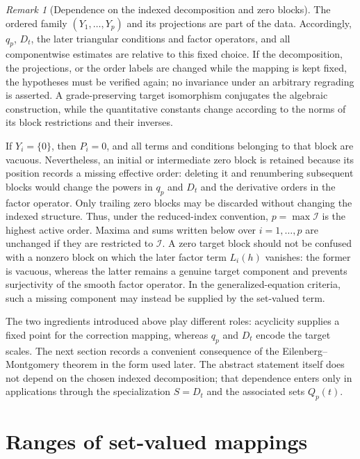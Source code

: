 \documentclass[11pt]{amsart}
\theoremstyle{definition}
\theoremstyle{remark}
\newtheorem{remark}[theorem]{Remark}
\begin{document}
	\begin{remark}[Dependence on the indexed decomposition and zero blocks]
		\label{rem:grading-dependence}
		The ordered family $(Y_1,\ldots,Y_p)$ and its projections are part of the
		data.  Accordingly, $q_p$, $D_t$, the later triangular conditions and
		factor operators, and all componentwise estimates are relative to this
		fixed choice.  If the decomposition, the projections, or the order labels
		are changed while the mapping is kept fixed, the hypotheses must be
		verified again; no invariance under an arbitrary regrading is asserted.
		A grade-preserving target isomorphism conjugates the algebraic construction,
		while the quantitative constants change according to the norms of its block
		restrictions and their inverses.
		
		If $Y_i=\{0\}$, then $P_i=0$, and all terms and conditions belonging to
		that block are vacuous.  Nevertheless, an initial or intermediate zero
		block is retained because its position records a missing effective order:
		deleting it and renumbering subsequent blocks would change the powers in
		$q_p$ and $D_t$ and the derivative orders in the factor operator.  Only
		trailing zero blocks may be discarded without changing the indexed
		structure.  Thus, under the reduced-index convention, $p=\max\mathcal I$
		is the highest active order.  Maxima and sums written below over
		$i=1,\ldots,p$ are unchanged if they are restricted to $\mathcal I$.
		A zero target block should not be confused with a nonzero block on which
		the later factor term $L_i(h)$ vanishes: the former is vacuous, whereas
		the latter remains a genuine target component and prevents surjectivity of
		the smooth factor operator.  In the generalized-equation criteria, such a
		missing component may instead be supplied by the set-valued term.
	\end{remark}
	
	The two ingredients introduced above play different roles: acyclicity
	supplies a fixed point for the correction mapping, whereas $q_p$ and
	$D_t$ encode the target scales. The next section records a convenient
	consequence of the Eilenberg--Montgomery theorem in the form used later.
	The abstract statement itself does not depend on the chosen indexed
	decomposition; that dependence enters only in applications through the
	specialization $S=D_t$ and the associated sets $Q_p(t)$.
	
	\section{Ranges of set-valued mappings}
	\label{sec:acyclic-range}
	
\end{document}
